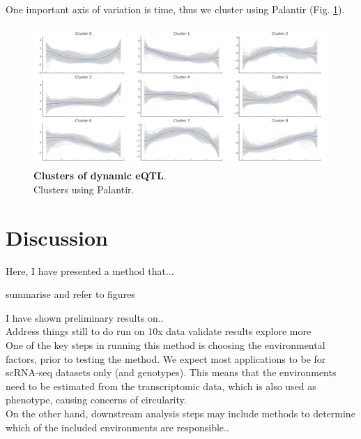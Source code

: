 \clearpage

One important axis of variation is time, thus we cluster using Palantir \cite{setty2019characterization}
(Fig. \ref{fig:sc_structlmm_clusters}).

\begin{figure}[h]
\centering
\includegraphics[width=15.5cm]{Chapter6/Fig/sc_structlmm_clusters.png}
\caption[Clusters of dynamic eQTL]{\textbf{Clusters of dynamic eQTL}.\\
Clusters using Palantir.}
\label{fig:sc_structlmm_clusters}
\end{figure}

\clearpage

\section{Discussion}

Here, I have presented a method that...

summarise and refer to figures

I have shown preliminary results on..\\


Address things still to do 
run on 10x data
validate results
explore more \\

One of the key steps in running this method is choosing the environmental factors, prior to testing the method.
We expect most applications to be for scRNA-seq datasets only (and genotypes).
This means that the environments need to be estimated from the transcriptomic data, which is also used as phenotype, causing concerns of circularity.\\

On the other hand, downstream analysis steps may include methods to determine which of the included environments are responsible..\\

